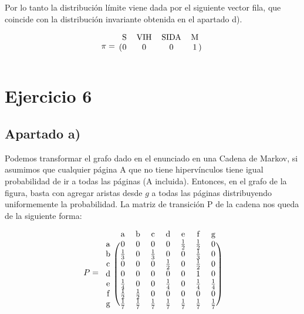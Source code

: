 \documentclass[11pt]{article}
\begin{document}
Por lo tanto la distribución límite viene dada por el siguiente vector fila, que
coincide con la distribución invariante obtenida en el apartado d).

\begin{equation*}
  \pi = 
  \begin{blockarray}{cccc}
     \text{S} & \text{VIH} & \text{SIDA} & \text{M} \\
    \begin{block}{(cccc)}
      0 & 0 & 0 & 1 \\
    \end{block}
  \end{blockarray}
\end{equation*}

\section{Ejercicio 6}

\subsection*{Apartado a)}

Podemos transformar el grafo dado en el enunciado en una Cadena de Markov,
si asumimos que cualquier página A que no tiene hipervínculos tiene igual 
probabilidad de ir a todas las páginas (A incluida). Entonces, en el grafo
de la figura, basta con agregar aristas desde $g$ a todas las páginas
distribuyendo uniformemente la probabilidad. 
La matriz de transición P de la cadena nos queda de la siguiente forma:

\begin{equation*}
  P = 
  \begin{blockarray}{cccccccc}
     & \text{a} & \text{b} & \text{c} & \text{d} & \text{e} & \text{f} & \text{g} \\
    \begin{block}{c(ccccccc)}
      \text{a} & 0           & 0           & 0           & 0           & \frac{1}{2} & \frac{1}{2} & 0 \\
      \text{b} & \frac{1}{3} & 0           & \frac{1}{3} & 0           & 0           & \frac{1}{3} & 0 \\
      \text{c} & 0           & 0           & 0           & \frac{1}{2} & 0           & \frac{1}{2} & 0 \\
      \text{d} & 0           & 0           & 0           & 0           & 0           & 1           & 0 \\
      \text{e} & \frac{1}{4} & 0           & 0           & \frac{1}{4} & 0           & \frac{1}{4} & \frac{1}{4} \\
      \text{f} & \frac{1}{2} & \frac{1}{2} & 0           & 0           & 0           & 0           & 0 \\
      \text{g} & \frac{1}{7} & \frac{1}{7} & \frac{1}{7} & \frac{1}{7} & \frac{1}{7} & \frac{1}{7} & \frac{1}{7} \\
    \end{block}
  \end{blockarray}
\end{equation*}
\end{document}

